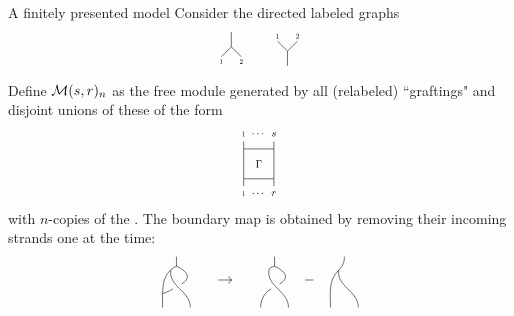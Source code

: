 \begin{frame}{A finitely presented model}
	\pause Consider the directed labeled graphs
	\[
	\begin{tikzpicture}[scale=.5]
		\draw (0,0)--(0,.75);
		\draw (0,0)--(.5,-.5);
		\draw (0,0)--(-.5,-.5);
		\node[scale=.5] at (-.5,-.75){1};
		\node[scale=.5] at (.5,-.75){2};
	\end{tikzpicture}
	\qquad
	\begin{tikzpicture}[scale=.5]
		\draw (0,0)--(0,-.75);
		\draw (0,0)--(.5,.5);
		\draw (0,0)--(-.5,.5);
		\node[scale=.5] at (-.5,.75){1};
		\node[scale=.5] at (.5,.75){2};
	\end{tikzpicture}
	\vspace*{-10pt}
	\]

	Define $\operatorname{\mathcal{M}}(s, r)_n$ as the free module generated by all (relabeled) ``graftings" and disjoint unions of these of the form
	\[
	\begin{tikzpicture}[scale=.75]
		\draw (-.5,1)--(.5,1)--(.5,0)--(-.5,0)--(-.5,1);
		\node[scale=.75] at (0,.5){$\Gamma$};

		\draw (-.5,1)--(-.5,1.25);
		\node[scale=.5] at (-.5,1.5){1};
		\draw (.5,1)--(.5,1.25);
		\node[scale=.75] at (.5,1.5){$s$};
		\node[scale=.75] at (0,1.5){$\cdots$};

		\draw (-.5,0)--(-.5,-.25);
		\node[scale=.5] at (-.5,-.5){1};
		\draw (.5,0)--(.5,-.25);
		\node[scale=.75] at (.5,-.5){$r$};
		\node[scale=.75] at (0,-.5){$\cdots$};
	\end{tikzpicture}
	\vspace*{-5pt}
	\]
	with $n$-copies of the \product.
	\pause The boundary map is obtained by removing their incoming strands one at the time: \vspace*{-5pt}
	\[
	\begin{tikzpicture}[scale=.35]
		\draw (1,3.7) to (1,3);
		\draw (1,3) to [out=205, in=90] (0,0);
		\draw [shorten >= 0cm] (.6,2.73) to [out=-100, in=90] (2,0);
		\draw [shorten >= .15cm] (1,3) to [out=-25, in=30, distance=1.1cm] (1,1.5);
		\draw [shorten <= .1cm] (1,1.5) to [out=210, in=20] (0,1);

		\draw[->] (4,2) to (5,2);
	\end{tikzpicture}
	\qquad %
	\begin{tikzpicture}[scale=.35]
		\draw (1,3.7) to (1,3);
		\draw (1,3) to [out=205, in=90] (.6,2.73);
		\draw [shorten >= 0cm] (.6,2.73) to [out=-100, in=90] (2,0);
		\draw [shorten >= .15cm] (1,3) to [out=-25, in=30, distance=1.1cm] (1,1.5);
		\draw [shorten <= .1cm] (1,1.5) to [out=210, in=90] (0,0);

		\draw (3.2,2) to (3.8,2);
	\end{tikzpicture}
	\quad %
	\begin{tikzpicture}[scale=.35]
		\draw (1,3.7) to [out=-90, in=45] (.6,2.73);
		\draw (.6,2.73) to [out=225, in=90] (0,0);
		\draw [shorten >= 0cm] (.6,2.73) to [out=-100, in=90] (2,0);
	\end{tikzpicture}
	\]
\end{frame}

